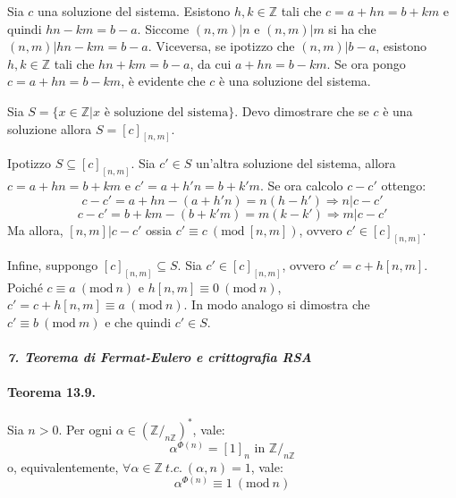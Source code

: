 \documentclass[12pt, a4paper]{report}
\theoremstyle{definition}
\newcommand{\Z}{\mathbb{Z}}
\newcommand{\Mod}[1]{\ (\mathrm{mod}\ #1)}
\newcommand{\inv}{(\Z/_{n\Z})^*}
\begin{document}
\begin{demonstration}
    Sia $c$ una soluzione del sistema. Esistono $h,k\in\Z$ tali che $c=a+hn=b+km$
    e quindi $hn-km=b-a$. Siccome $(n,m)|n$ e $(n,m)|m$ si ha che $(n,m)|hn-km=b-a$.
    Viceversa, se ipotizzo che $(n,m)|b-a$, esistono $h,k\in\Z$ tali che $hn+km=b-a$,
    da cui $a+hn=b-km$. Se ora pongo $c=a+hn=b-km$, è evidente che $c$ è una
    soluzione del sistema.

    Sia $S=\{x\in\Z|x \text{ è soluzione del sistema}\}$. Devo dimostrare che se
    $c$ è una soluzione allora $S=[c]_{[n,m]}$.

    Ipotizzo $S\subseteq[c]_{[n,m]}$. Sia $c'\in S$ un'altra soluzione del sistema,
    allora $c=a+hn=b+km$ e $c'=a+h'n=b+k'm$. Se ora calcolo $c-c'$ ottengo:
    \[c-c'=a+hn-(a+h'n)=n(h-h')\Rightarrow n|c-c'\]
    \[c-c'=b+km-(b+k'm)=m(k-k')\Rightarrow m|c-c'\]
    Ma allora, $[n,m]|c-c'$ ossia $c'\equiv c\Mod{[n,m]}$, ovvero $c'\in[c]_{[n,m]}$.

    Infine, suppongo $[c]_{[n,m]}\subseteq S$. Sia $c'\in[c]_{[n,m]}$, ovvero $c'=
    c+h[n,m]$. Poiché $c\equiv a\Mod{n}$ e $h[n,m]\equiv 0\Mod{n}$, $c'=c+h[n,m]
    \equiv a\Mod{n}$. In modo analogo si dimostra che $c'\equiv b\Mod{m}$ e che
    quindi $c'\in S$.
\end{demonstration}

\newpage
\paragraph{\emph{7. Teorema di Fermat-Eulero e crittografia RSA}}
\paragraph{Teorema 13.9.}
Sia $n>0$. Per ogni $\alpha\in\inv$, vale:
\[\alpha^{\Phi(n)}=[1]_n \text{ in } \Z/_{n\Z}\]
o, equivalentemente, $\forall\alpha\in\Z\ t.c.\ (\alpha,n)=1$, vale:
\[\alpha^{\Phi(n)}\equiv 1\Mod{n}\]
\end{document}
